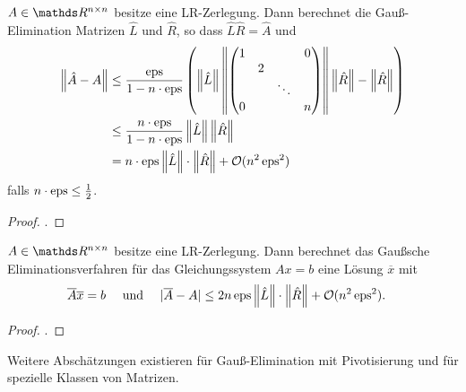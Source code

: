 \begin{Satze}
  $A \in \R^{n\times n}$ besitze eine LR-Zerlegung. Dann berechnet die
  Gauß-Elimination Matrizen $\hat{L}$ und $\hat{R}$,
  so dass $\hat{L}\hat{R} =\hat{A}$
  und
  \begin{align*}
     \nn[\hat{A}-A] 
     & \leq 
       \frac{\Eps}{1-n \cdot \Eps}
       \left( \nn[\hat{L}]
       \nn[{\begin{pmatrix}
         1 && & 0\\
         &2\\
         &&\ddots \\
         0&&& n\\
       \end{pmatrix}}]
    \nn[\hat{R}]-\nn[\hat{R}]
     \right)\\
    & \leq  \frac{n\cdot \Eps}{1-n\cdot \Eps}\nn[\hat{L}]\nn[\hat{R}] \\
    & = n\cdot \Eps \nn[\hat{L}]\cdot \nn[\hat{R}] 
      + \mathcal{O}( n^2 \Eps^2)
  \end{align*}
  falls $n\cdot \Eps \leq \frac{1}{2}$.
\end{Satze}
\begin{proof}
  \cite[siehe][]{stoerbulirsch}.
\end{proof}


\begin{Satze}[Sautter 1971]
  $ A \in \R^{n\times n}$ besitze eine LR-Zerlegung.  Dann berechnet das
  Gaußsche Eliminationsverfahren für das Gleichungssystem
  $Ax = b$ eine Lösung $\overline{x}$ mit 
  \begin{align*} 
    \overline{A} \overline{x} &= b
    &\text{ und }& 
    & |\overline{A}-A|  
    &\leq  2n\Eps
      \nn[\hat{L}]\cdot\nn[\hat{R}]+\mathcal{O}(n^2\Eps^2).
  \end{align*}
\end{Satze}

\begin{proof}
  \cite[siehe][]{deuflhardhohmann}.
\end{proof}

Weitere Abschätzungen existieren für Gauß-Elimination mit 
Pivotisierung und für spezielle Klassen von Matrizen.

